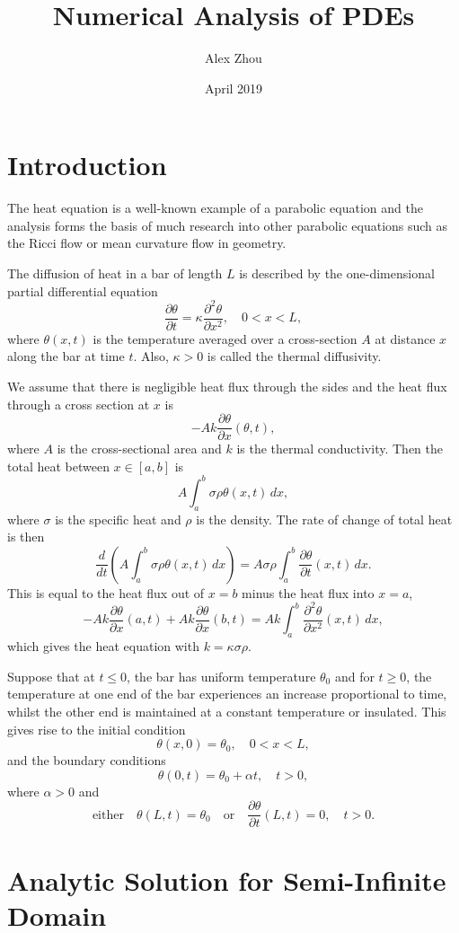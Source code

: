 \documentclass{article}
\title{Numerical Analysis of PDEs}
\author{Alex Zhou}
\date{April 2019}
\newcommand{\pder}[2][]{\frac{\partial#1}{\partial#2}}
\newcommand{\spder}[2][]{\frac{\partial^2#1}{\partial#2^2}}
\begin{document}
\maketitle

\section{Introduction}

The heat equation is a well-known example of a parabolic equation and the analysis forms the basis of much research into other parabolic equations such as the Ricci flow or mean curvature flow in geometry.

The diffusion of heat in a bar of length \(L\) is described by the one-dimensional partial differential equation
\[ \pder[\theta]{t} = \kappa \spder[\theta]{x}, \quad 0 < x < L, \]
where \(\theta(x,t)\) is the temperature averaged over a cross-section \(A\) at distance \(x\) along the bar at time \(t\). Also, \(\kappa > 0\) is called the thermal diffusivity. 

We assume that there is negligible heat flux through the sides and the heat flux through a cross section at \(x\) is 
\[ -Ak \pder[\theta]{x}(\theta, t), \]
where \(A\) is the cross-sectional area and \(k\) is the thermal conductivity. Then the total heat between \(x \in [a, b]\) is 
\[ A\int_a^b \sigma\rho\theta(x,t)\,dx, \]
where \(\sigma\) is the specific heat and \(\rho\) is the density. The rate of change of total heat is then
\[ \frac{d}{dt}\left( A\int_a^b \sigma\rho\theta(x,t)\,dx \right) = A\sigma\rho\int_a^b \pder[\theta]{t}(x,t)\,dx. \]
This is equal to the heat flux out of \(x = b\) minus the heat flux into \(x = a\),
\[ -Ak\pder[\theta]{x}(a, t) + Ak\pder[\theta]{x}(b,t) = Ak\int_a^b \spder[\theta]{x}(x,t)\,dx, \]
which gives the heat equation with \(k = \kappa\sigma\rho\).

Suppose that at \(t \leq 0\), the bar has uniform temperature \(\theta_0\) and for \(t \geq 0\), the temperature at one end of the bar experiences an increase proportional to time, whilst the other end is maintained at a constant temperature or insulated. This gives rise to the initial condition
\[ \theta(x, 0) = \theta_0, \quad 0 < x < L, \]
and the boundary conditions
\[ \theta(0,t) = \theta_0 + \alpha t, \quad t > 0, \]
where \(\alpha > 0\) and 
\[ \mbox{either} \quad \theta(L, t) = \theta_0 \quad \mbox{or} \quad \pder[\theta]{t}(L,t) = 0, \quad t > 0. \]
\section{Analytic Solution for Semi-Infinite Domain}
\end{document}
